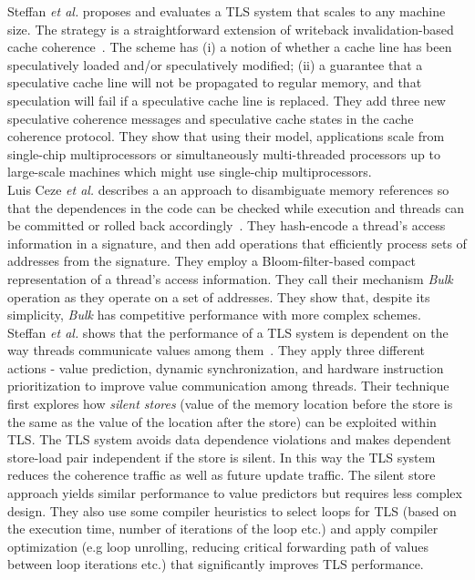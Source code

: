 \documentclass[10pt]{report}          %
\begin{document}
Steffan \textit{et al.} proposes and evaluates a TLS system that scales to any machine size.  The strategy is a straightforward extension of writeback invalidation-based cache coherence~\cite{steffanISCA00}. The scheme has (i) a notion of whether a cache line has been speculatively loaded and/or speculatively modified; (ii) a guarantee that a speculative cache line will not be propagated to regular memory, and that speculation will fail if a speculative cache line is replaced.  They add three new speculative coherence messages and speculative cache states in the cache coherence protocol.  They show that using their model, applications scale from single-chip multiprocessors or simultaneously multi-threaded processors up to large-scale machines which might use single-chip multiprocessors.\\
Luis Ceze \textit{et al.} describes a an approach to disambiguate memory references so that the dependences in the code can be checked while execution and threads can be committed or rolled back accordingly~\cite{bulk}.  They hash-encode a thread's access information in a signature, and then add operations that efficiently process sets of addresses from the signature.  They employ a Bloom-filter-based compact representation of a thread's access information.  They call their mechanism \textit{Bulk} operation as they operate on a set of addresses.  They show that, despite its simplicity, \textit{Bulk} has competitive performance with more complex schemes.\\
Steffan\textit{ et al.} shows that the performance of a TLS system is dependent on the way threads communicate values among them~\cite{value_communication}.  They apply three different actions - value prediction, dynamic synchronization, and hardware instruction prioritization to improve value communication among threads. Their technique first explores how \textit{silent stores} (value of the memory location before the store is the same as the value of the location after the store) can be exploited within TLS. The TLS system avoids data dependence violations and makes dependent store-load pair independent if the store is silent.  In this way the TLS system reduces the coherence traffic as well as future update traffic. The silent store approach yields similar performance to value predictors but requires less complex design.  They also use some compiler heuristics to select loops for TLS (based on the execution time, number of iterations of the loop etc.) and apply compiler optimization (e.g loop unrolling, reducing critical forwarding path of values between loop iterations etc.) that significantly improves TLS performance.\\
\\
\\
\\
\end{document}

